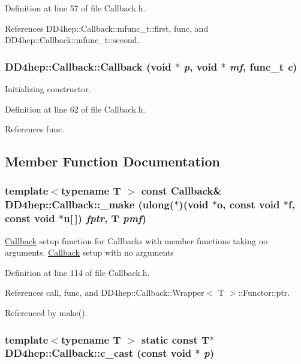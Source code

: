 Definition at line 57 of file Callback.h.

References DD4hep::Callback::mfunc\_\-t::first, func, and DD4hep::Callback::mfunc\_\-t::second.\hypertarget{class_d_d4hep_1_1_callback_ad9377008515da7c31829f8f1c77c0be8}{
\subsubsection[{Callback}]{\setlength{\rightskip}{0pt plus 5cm}DD4hep::Callback::Callback (void $\ast$ {\em p}, \/  void $\ast$ {\em mf}, \/  {\bf func\_\-t} {\em c})}}
\label{class_d_d4hep_1_1_callback_ad9377008515da7c31829f8f1c77c0be8}


Initializing constructor. 

Definition at line 62 of file Callback.h.

References func.

\subsection{Member Function Documentation}
\hypertarget{class_d_d4hep_1_1_callback_af46adbf158456243c857aadf77295387}{
\subsubsection[{\_\-make}]{\setlength{\rightskip}{0pt plus 5cm}template$<$typename T $>$ const {\bf Callback}\& DD4hep::Callback::\_\-make ({\bf ulong}($\ast$)(void $\ast$o, const void $\ast$f, const void $\ast$u\mbox{[}$\,$\mbox{]}) {\em fptr}, \/  {\bf T} {\em pmf})}}
\label{class_d_d4hep_1_1_callback_af46adbf158456243c857aadf77295387}


\hyperlink{class_d_d4hep_1_1_callback}{Callback} setup function for Callbacks with member functions taking no arguments. \hyperlink{class_d_d4hep_1_1_callback}{Callback} setup with no arguments 

Definition at line 114 of file Callback.h.

References call, func, and DD4hep::Callback::Wrapper$<$ T $>$::Functor::ptr.

Referenced by make().\hypertarget{class_d_d4hep_1_1_callback_a6fdb65785fe0baceaa35ba72697ec20f}{
\subsubsection[{c\_\-cast}]{\setlength{\rightskip}{0pt plus 5cm}template$<$typename T $>$ static const {\bf T}$\ast$ DD4hep::Callback::c\_\-cast (const void $\ast$ {\em p})}}
\label{class_d_d4hep_1_1_callback_a6fdb65785fe0baceaa35ba72697ec20f}


